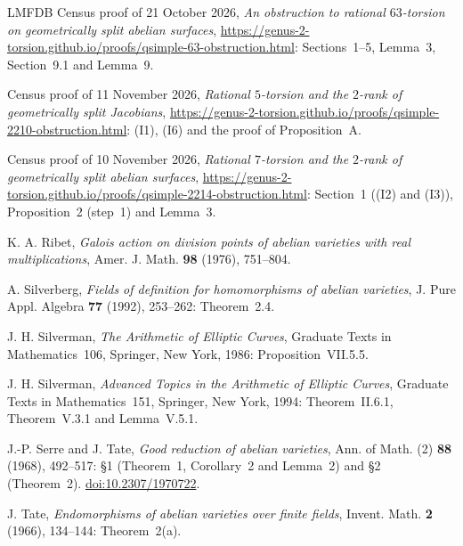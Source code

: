 \documentclass[11pt]{article}
\begin{document}
\begin{thebibliography}{LMFDB}
Census proof of 21 October 2026, \emph{An obstruction to rational \(63\)-torsion on geometrically split abelian
surfaces}, \url{https://genus-2-torsion.github.io/proofs/qsimple-63-obstruction.html}: Sections~1--5,
Lemma~3, Section~9.1 and Lemma~9.

Census proof of 11 November 2026, \emph{Rational \(5\)-torsion and the \(2\)-rank of geometrically split
Jacobians}, \url{https://genus-2-torsion.github.io/proofs/qsimple-2210-obstruction.html}: (I1), (I6) and the proof
of Proposition~A.

Census proof of 10 November 2026, \emph{Rational \(7\)-torsion and the \(2\)-rank of geometrically split abelian
surfaces}, \url{https://genus-2-torsion.github.io/proofs/qsimple-2214-obstruction.html}: Section~1 ((I2) and
(I3)), Proposition~2 (step~1) and Lemma~3.

K. A. Ribet, \emph{Galois action on division points of abelian varieties with real multiplications}, Amer. J.
Math. \textbf{98} (1976), 751--804.

A. Silverberg, \emph{Fields of definition for homomorphisms of abelian varieties}, J. Pure Appl. Algebra
\textbf{77} (1992), 253--262: Theorem~2.4.

J. H. Silverman, \emph{The Arithmetic of Elliptic Curves}, Graduate Texts in Mathematics~106, Springer, New York,
1986: Proposition~VII.5.5.

J. H. Silverman, \emph{Advanced Topics in the Arithmetic of Elliptic Curves}, Graduate Texts in Mathematics~151,
Springer, New York, 1994: Theorem~II.6.1, Theorem~V.3.1 and Lemma~V.5.1.

J.-P. Serre and J. Tate, \emph{Good reduction of abelian varieties}, Ann. of Math. (2) \textbf{88} (1968),
492--517: \S1 (Theorem~1, Corollary~2 and Lemma~2) and \S2 (Theorem~2).
\href{https://doi.org/10.2307/1970722}{doi:10.2307/1970722}.

J. Tate, \emph{Endomorphisms of abelian varieties over finite fields}, Invent. Math. \textbf{2} (1966), 134--144:
Theorem~2(a).

\end{thebibliography}
\end{document}
